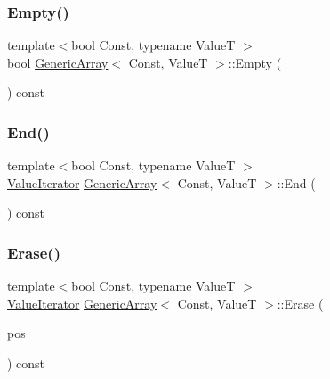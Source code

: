\mbox{\label{classGenericArray_af09e3aaeaeeb5fd825d79cc6663dfcf5}} 
\subsubsection{\texorpdfstring{Empty()}{Empty()}}
{\footnotesize\ttfamily template$<$bool Const, typename ValueT $>$ \\
bool \hyperlink{classGenericArray}{Generic\+Array}$<$ Const, ValueT $>$\+::Empty (\begin{DoxyParamCaption}{ }\end{DoxyParamCaption}) const\hspace{0.3cm}{\ttfamily [inline]}}

\mbox{\label{classGenericArray_a396f83d328f4879225106ea14b1dca84}} 
\subsubsection{\texorpdfstring{End()}{End()}}
{\footnotesize\ttfamily template$<$bool Const, typename ValueT $>$ \\
\hyperlink{classGenericArray_afc6ad62c3f00531fa378db266182704a}{Value\+Iterator} \hyperlink{classGenericArray}{Generic\+Array}$<$ Const, ValueT $>$\+::End (\begin{DoxyParamCaption}{ }\end{DoxyParamCaption}) const\hspace{0.3cm}{\ttfamily [inline]}}

\mbox{\label{classGenericArray_aefa57a363accf2ade867583771f8a54b}} 
\subsubsection{\texorpdfstring{Erase()}{Erase()}\hspace{0.1cm}{\footnotesize\ttfamily [1/2]}}
{\footnotesize\ttfamily template$<$bool Const, typename ValueT $>$ \\
\hyperlink{classGenericArray_afc6ad62c3f00531fa378db266182704a}{Value\+Iterator} \hyperlink{classGenericArray}{Generic\+Array}$<$ Const, ValueT $>$\+::Erase (\begin{DoxyParamCaption}\item[{\hyperlink{classGenericArray_a1cd7bb3e75ccfeed3e8b0a6bb5563d68}{Const\+Value\+Iterator}}]{pos }\end{DoxyParamCaption}) const\hspace{0.3cm}{\ttfamily [inline]}}

